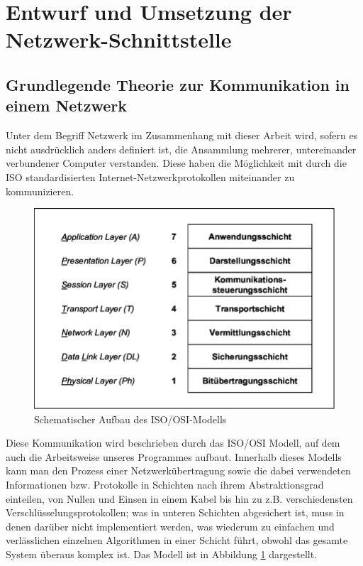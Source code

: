 
%
\section{Entwurf und Umsetzung der Netzwerk-Schnittstelle}
\subsection{Grundlegende Theorie zur Kommunikation in einem Netzwerk}
Unter dem Begriff Netzwerk im Zusammenhang mit dieser Arbeit wird, sofern es nicht ausdrücklich anders definiert ist, die Ansammlung mehrerer, untereinander verbundener Computer verstanden.
Diese haben die Möglichkeit mit durch die ISO standardisierten Internet-Netzwerkprotokollen miteinander zu kommunizieren.\\ 

\begin{figure}
\includegraphics[scale=1]{isoosi}
\caption{Schematischer Aufbau des ISO/OSI-Modells\protect\footnotemark}
\label{ISOOSI}
\end{figure}

Diese Kommunikation wird beschrieben durch das ISO/OSI Modell, auf dem auch die Arbeitsweise unseres Programmes aufbaut.
Innerhalb dieses Modells kann man den Prozess einer Netzwerkübertragung sowie die dabei verwendeten Informationen bzw. Protokolle in Schichten nach ihrem Abstraktionsgrad einteilen, von Nullen und Einsen in einem Kabel bis hin zu z.B. verschiedensten Verschlüsselungsprotokollen; was in unteren Schichten abgesichert ist, muss in denen darüber nicht implementiert werden, was wiederum zu einfachen und verlässlichen einzelnen Algorithmen in einer Schicht führt, obwohl das gesamte System überaus komplex ist. 
Das Modell ist in Abbildung \ref{ISOOSI} dargestellt.

